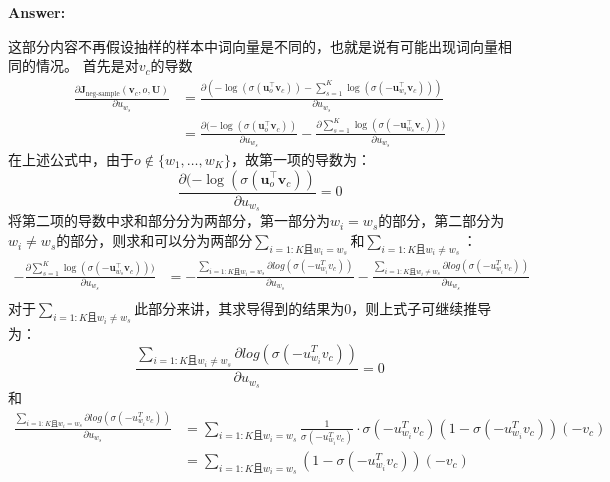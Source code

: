 \documentclass{article}
\newenvironment{answer}{
    {\bf Answer:} \sf \begingroup\color{red}
}{\endgroup}%
\begin{document}
\begin{enumerate}[label=(\alph*)]
\begin{shaded}
\begin{answer}
这部分内容不再假设抽样的样本中词向量是不同的，也就是说有可能出现词向量相同的情况。
首先是对$v_c$的导数
\begin{equation}
\begin{array}{cl}
		\frac{\partial \bm J_{\text{neg-sample}}(\bm v_c, o, \bm U)}{\partial u_{w_s}} &= \frac{ \partial (-\log(\sigma(\bm u_o^\top \bm v_c)) - \sum_{s=1}^K \log(\sigma(-\bm u_{w_s}^\top \bm v_c)))} {\partial u_{w_s}}\\
		&=\frac{ \partial (-\log(\sigma(\bm u_o^\top \bm v_c))}{\partial u_{w_s}} - \frac{\partial \sum_{s=1}^K \log(\sigma(-\bm u_{w_s}^\top \bm v_c)))}{\partial u_{w_s}}
\end{array}
\end{equation}
在上述公式中，由于$o \notin \{w_1,\dots,w_K\}$，故第一项的导数为：
\begin{equation}
		\frac{ \partial (-\log(\sigma(\bm u_o^\top \bm v_c))}{\partial u_{w_s}} =  0
\end{equation}
将第二项的导数中求和部分分为两部分，第一部分为$w_i =w_s$的部分，第二部分为$w_i \neq w_s$的部分，则求和可以分为两部分$\sum_{i=1:K \text{且} w_i=w_s}$和$\sum_{i=1:K \text{且} w_i\neq w_s}$：
\begin{equation}
	\begin{array}{cl}
		-\frac{\partial \sum_{s=1}^K \log(\sigma(-\bm u_{w_s}^\top \bm v_c)))}{\partial u_{w_s}} &= -\frac{\sum_{i=1:K \text{且} w_i=w_s} \partial log(\sigma(-u_{w_i}^T v_c))}{\partial  u_{w_s}} - \frac{\sum_{i=1:K \text{且} w_i\neq w_s}\partial log(\sigma(-u_{w_i}^T v_c))}{\partial u_{w_s}}\\
	\end{array}
\end{equation}
对于$\sum_{i=1:K \text{且} w_i\neq w_s}$此部分来讲，其求导得到的结果为0，则上式子可继续推导为：
\begin{equation}
	\frac{\sum_{i=1:K \text{且} w_i\neq w_s}\partial log(\sigma(-u_{w_i}^T v_c))}{\partial u_{w_s}} = 0
\end{equation}
和
\begin{equation}
	\begin{array}{cl}
		\frac{\sum_{i=1:K \text{且} w_i=w_s} \partial log(\sigma(-u_{w_i}^T v_c))}{\partial  u_{w_s}} &= \sum_{i=1:K \text{且} w_i=w_s}\frac{1}{\sigma(-u_{w_i}^T v_c)} \cdot \sigma(-u_{w_i}^T v_c) (1- \sigma(-u_{w_i}^T v_c)) (-v_c) \\
		&= \sum_{i=1:K \text{且} w_i=w_s}(1-\sigma(-u_{w_i}^T v_c))(-v_c)
	\end{array}
\end{equation}


\end{answer}
\end{shaded}
\end{enumerate}
\end{document}
